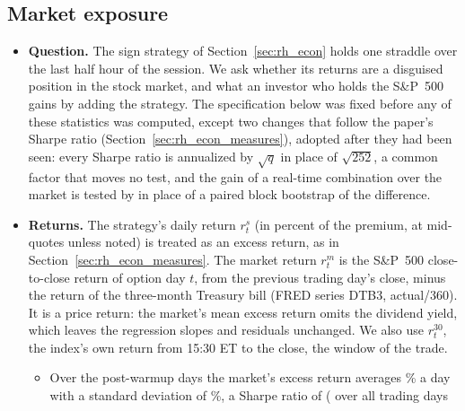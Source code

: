 \subsection{Market exposure}
\label{app:rh_econ_beta}
\begin{itemize}
\item \textbf{Question.} The sign strategy of Section~\ref{sec:rh_econ} holds one straddle over the last half hour of
  the session. We ask whether its returns are a disguised position in the stock market, and what an investor who holds
  the S\&P~500 gains by adding the strategy. The specification below was fixed before any of these statistics was
  computed, except two changes that follow the paper's Sharpe ratio (Section~\ref{sec:rh_econ_measures}), adopted
  after they had been seen: every Sharpe ratio is annualized by $\sqrt{q}$ in place of $\sqrt{252}$, a common factor
  that moves no test, and the gain of a real-time combination over the market is tested by \citet{LedoitWolf2008} in
  place of a paired block bootstrap of the difference.
\item \textbf{Returns.} The strategy's daily return $r^{s}_t$ (in percent of the premium, at mid-quotes unless noted)
  is treated as an excess return, as in Section~\ref{sec:rh_econ_measures}. The market return $r^{m}_t$ is the
  S\&P~500 close-to-close return of option day $t$, from the previous trading day's close, minus the return of the
  three-month Treasury bill (FRED series DTB3, actual/360). It is a price return: the market's mean excess return
  omits the dividend yield, which leaves the regression slopes and residuals unchanged. We also use $r^{30}_t$, the
  index's own return from 15:30 ET to the close, the window of the trade.
  \begin{itemize}
  \item Over the \rhebNDays{} post-warmup days the market's excess return averages \rhebMktMean\% a day with a
    standard deviation of \rhebMktSd\%, a Sharpe ratio of \rhebSRm{} (\rhebSRmAll{} over all \rhebNAll{} trading days

\end{itemize}
\end{itemize}
